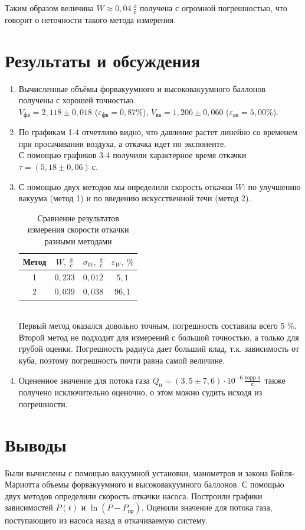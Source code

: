\documentclass[a4paper]{article}
\begin{document}
\begin{enumerate}
Таким образом величина $W \approx  0,04 \ \frac{\text{л}}{\text{с}}$ получена с огромной погрешностью, что говорит о неточности такого метода измерения.

\end{enumerate}

\section{Результаты и обсуждения}
\begin{enumerate}
\item Вычисленные объёмы форвакуумного и высоковакуумного баллонов получены с хорошей точностью. \\$V_\text{фв} = 2,118 \pm 0,018$ ($\varepsilon_\text{фв} =0,87 \%$), $V_\text{вв} = 1,206 \pm 0,060$ ($\varepsilon_\text{вв} =5,00 \%$).
\item По графикам 1-4 отчетливо видно, что давление растет линейно со временем при просачивании воздуха, а откачка идет по экспоненте.\\ С помощью графиков 3-4 получили характерное время откачки $\tau = (5,18 \pm 0,06) \ \text{с}$.
\item С помощью двух методов мы определили скорость откачки $W$: по улучшению вакуума (метод 1) и по введению искусственной течи (метод 2).
\begin{table}[h!]
    \centering
    \begin{tabular}{|c|c|c|c|}
        \hline
        Метод & $W,\ \frac{\text{л}}{\text{с}}$ & $\sigma_W,\ \frac{\text{л}}{\text{с}}$ & $\varepsilon_W,\ \%$ \\
        \hline
        1 & $0{,}233$ & $0{,}012$ & $5{,}1$ \\ \hline
        2 & $0{,}039$ & $0{,}038$ & $96{,}1$ \\
        \hline
    \end{tabular}
    \caption{Сравнение результатов измерения скорости откачки разными методами}
\end{table}
\\Первый метод оказался довольно точным, погрешность составила всего 5 \%. Второй метод не подходит для измерений с большой точностью, а только для грубой оценки. Погрешность радиуса дает больший клад, т.к. зависимость от куба, поэтому погрешность почти равна самой величине.
\item Оцененное значение для потока газа $Q_\text{н} =  (3,5 \pm 7,6) \cdot 10^{-6} \frac{\text{торр} \cdot \text{л}}{\text{с}}$ также получено исключительно оценочно, о этом можно судить исходя из погрешности. 
\end{enumerate}

\section{Выводы}
Были вычислены с помощью вакуумной установки, манометров и закона Бойля-Мариотта объемы форвакуумного и высоковакуумного баллонов. С помощью двух методов определили скорость откачки насоса. Построили графики зависимостей $P(t)$ и $\ln(P - P_\text{пр})$. Оценили значение для потока газа, поступающего из насоса назад в откачиваемую систему.
\end{document}
